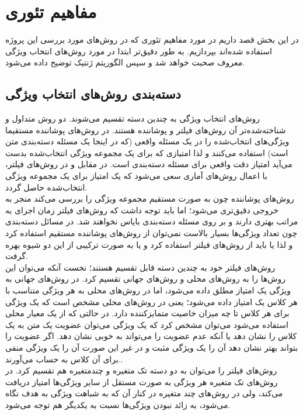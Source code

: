 \chapter{مفاهیم تئوری}
در این بخش قصد داریم در مورد مفاهیم تئوری که در روش‌های مورد بررسی این پروژه استفاده شده‌اند بپردازیم. به طور دقیق‌تر ابتدا در مورد روش‌های انتخاب ویژگی معروف صحبت خواهد شد و سپس الگوریتم ژنتیک توضیح داده می‌شود.


\section{دسته‌بندی روش‌های انتخاب ویژگی}
روش‌های انتخاب ویژگی به چندین دسته تقسیم می‌شوند. دو روش متداول و شناخته‌شده‌تر آن روش‌های فیلتر و پوشاننده هستند. در روش‌های پوشاننده مستقیما ویژگی‌های انتخاب‌شده را در یک مسئله واقعی (که در اینجا یک مسئله دسته‌بندی متن است) استفاده می‌کنند و لذا امتیازی که برای یک مجموعه ویژگی انتخاب‌شده بدست می‌آید امتیاز دقت واقعی برای مسئله دسته‌بندی است. در مقابل و در روش‌های فیلتر،‌ با اعمال روش‌های آماری سعی می‌شود که یک امتیاز برای یک مجموعه ویژگی انتخاب‌شده حاصل گردد.
\\

روش‌های پوشاننده چون به صورت مستقیم مجموعه ویژگی را بررسی می‌کند منجر به خروجی دقیق‌تری می‌شود؛ اما باید توجه داشت که روش‌های فیلتر زمان اجرای به مراتب بهتری دارند و بر روی مسئله دسته‌بندی بایاس نخواهند شد\cite{labani2018novel}. در مسائل دسته‌بندی چون تعداد ویژگی‌ها بسیار بالاست نمی‌توان از روش‌های پوشاننده مستقیم استفاده کرد و لذا یا باید از روش‌های فیلتر استفاده کرد و یا به صورت ترکیبی از این دو شیوه بهره گرفت.
\\

روش‌های فیلتر خود به چندین دسته قابل تقسیم هستند؛ نخست آنکه می‌توان این روش‌ها را به روش‌های محلی و روش‌های جهانی تقسیم کرد. در روش‌های جهانی به ویژگی یک امتیاز مطلق داده می‌شود، اما در روش‌های محلی به هر ویژگی متناسب با هر کلاس یک امتیاز داده می‌شود؛ یعنی در روش‌های محلی مشخص است که یک ویژگی برای هر کلاس تا چه میزان خاصیت متمایزکننده دارد. در حالتی که از یک معیار محلی استفاده می‌شود می‌توان مشخص کرد که یک ویژگی می‌توان عضویت یک متن به یک کلاس را نشان دهد یا آنکه عدم عضویت را می‌تواند به خوبی نشان دهد. اگر عضویت را بتواند بهتر نشان دهد آن را یک ویژگی مثبت و در غیر این صورت آن را یک ویژگی منفی برای آن کلاس به حساب می‌آورند.\cite{uysal2016improved}.
\\

روش‌های فیلتر را می‌توان به دو دسته تک متغیره و چندمتغیره  هم تقسیم کرد. در روش‌های تک متغیره هر ویژگی به صورت مستقل از سایر ویژگی‌ها امتیاز دریافت می‌کند، ولی در روش‌های چند متغیره در کنار آن که به شباهت ویژگی به هدف نگاه می‌شود، به زائد نبودن ویژگی‌ها نسبت به یکدیگر هم توجه می‌شود.\cite{labani2018novel}

